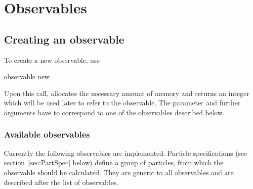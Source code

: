 \section{Observables}


\subsection{Creating an observable}
To create a new observable, use
\begin{essyntax}
  observable new  
\end{essyntax}
  
Upon this call, \es allocates the necessary amount of memory and returns 
an integer  which will be used later to refer to the observable. 
The parameter  and further arguments have to correspond to one of the
observables described below.

\subsubsection{Available observables}
Currently the following observables are implemented.
Particle specifications (see section~\ref{sec:PartSpec} below)
define a group of particles, from which the observable should be calculated. 
They are generic to all observables and are described after the list of observables.


